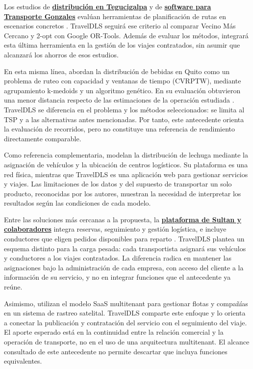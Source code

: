 Los estudios de \textbf{\hyperref[ant:aguilar]{distribución en Tegucigalpa}} y de \textbf{\hyperref[ant:hernandez]{software para Transporte Gonzales}} evalúan herramientas de planificación de rutas en escenarios concretos \parencites[p.~56]{aguilar2022optimizacion}[p.~111]{hernandez2024evaluacion}. TravelDLS seguirá ese criterio al comparar Vecino Más Cercano y 2-opt con Google OR-Tools. Además de evaluar los métodos, integrará esta última herramienta en la gestión de los viajes contratados, sin asumir que alcanzará los ahorros de esos estudios.

En esta misma línea, \textcite[pp.~15--17, 28--31]{martinez2020ruteo} abordan la distribución de bebidas en Quito como un problema de ruteo con capacidad y ventanas de tiempo (CVRPTW), mediante agrupamiento k-medoids y un algoritmo genético. En su evaluación obtuvieron una menor distancia respecto de las estimaciones de la operación estudiada \parencite[p.~37]{martinez2020ruteo}. TravelDLS se diferencia en el problema y los métodos seleccionados: se limita al TSP y a las alternativas antes mencionadas. Por tanto, este antecedente orienta la evaluación de recorridos, pero no constituye una referencia de rendimiento directamente comparable.

Como referencia complementaria, \textcite[pp.~20--24]{alvarez2016plataforma} modelan la distribución de lechuga mediante la asignación de vehículos y la ubicación de centros logísticos. Su plataforma es una red física, mientras que TravelDLS es una aplicación web para gestionar servicios y viajes. Las limitaciones de los datos y del supuesto de transportar un solo producto, reconocidas por los autores, muestran la necesidad de interpretar los resultados según las condiciones de cada modelo.

Entre las soluciones más cercanas a la propuesta, la \textbf{\hyperref[ant:sultan]{plataforma de Sultan y colaboradores}} integra reservas, seguimiento y gestión logística, e incluye conductores que eligen pedidos disponibles para reparto \parencite[pp.~1--4]{sultan2022real}. TravelDLS plantea un esquema distinto para la carga pesada: cada transportista asignará sus vehículos y conductores a los viajes contratados. La diferencia radica en mantener las asignaciones bajo la administración de cada empresa, con acceso del cliente a la información de su servicio, y no en integrar funciones que el antecedente ya reúne.

Asimismo, \textcite{lasluisa2026diseno} utilizan el modelo SaaS multitenant para gestionar flotas y compañías en un sistema de rastreo satelital. TravelDLS comparte este enfoque y lo orienta a conectar la publicación y contratación del servicio con el seguimiento del viaje. El aporte esperado está en la continuidad entre la relación comercial y la operación de transporte, no en el uso de una arquitectura multitenant. El alcance consultado de este antecedente no permite descartar que incluya funciones equivalentes.


